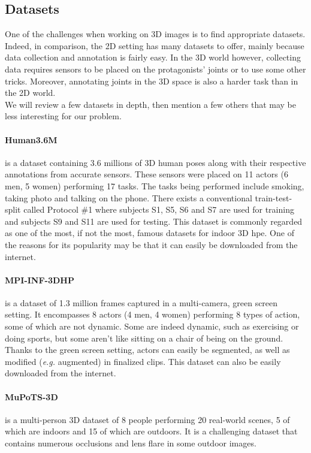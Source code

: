 \documentclass[runningheads]{llncs}
\begin{document}
\subsection{Datasets}
One of the challenges when working on 3D images is to find appropriate datasets. Indeed, in comparison, the 2D setting has many datasets to offer, mainly because data collection and annotation is fairly easy. In the 3D world however, collecting data requires sensors to be placed on the protagonists' joints or to use some other tricks. Moreover, annotating joints in the 3D space is also a harder task than in the 2D world. \\
We will review a few datasets in depth, then mention a few others that may be less interesting for our problem.
\paragraph{Human3.6M} \cite{Human3.6M} is a dataset containing 3.6 millions of 3D human poses along with their respective annotations from accurate sensors. These sensors were placed on 11 actors (6 men, 5 women) performing 17 tasks. The tasks being performed include smoking, taking photo and talking on the phone. There exists a conventional train-test-split called Protocol \#1 where subjects S1, S5, S6 and S7 are used for training and subjects S9 and S11 are used for testing. This dataset is commonly regarded as one of the most, if not the most, famous datasets for indoor 3D \ac{hpe}. One of the reasons for its popularity may be that it can easily be downloaded from the internet.
\paragraph{MPI-INF-3DHP} \cite{MPI-INF-3DHP} is a dataset of 1.3 million frames captured in a multi-camera, green screen setting. It encompasses 8 actors (4 men, 4 women) performing 8 types of action, some of which are not dynamic. Some are indeed dynamic, such as exercising or doing sports, but some aren't like sitting on a chair of being on the ground. Thanks to the green screen setting, actors can easily be segmented, as well as modified (\textit{e.g.} augmented) in finalized clips. This dataset can also be easily downloaded from the internet.
\paragraph{MuPoTS-3D} \cite{MuPoTS-3D} is a multi-person 3D dataset of 8 people performing 20 real-world scenes, 5 of which are indoors and 15 of which are outdoors. It is a challenging dataset that contains numerous occlusions and lens flare in some outdoor images.
\end{document}

